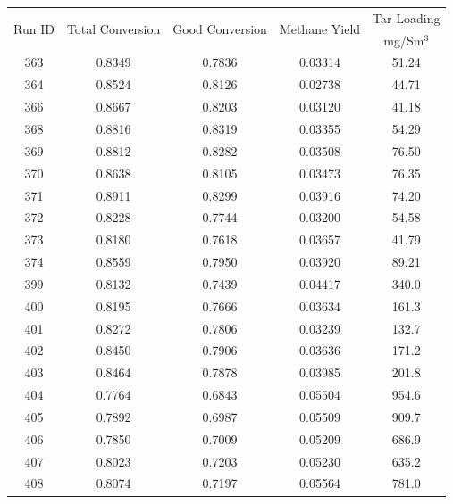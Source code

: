 \documentclass[11pt,twocolumn]{article}
\begin{document}
\begin{center}
\begin{tabular}{ccccc}
\toprule
\multirow{2}{*}{Run ID} &  \multirow{2}{*}{Total Conversion} &  \multirow{2}{*}{Good Conversion} &  \multirow{2}{*}{Methane Yield} & Tar Loading \\
{}	&	{}	&	{}	&	{}	&	mg/Sm$^3$	\\
\midrule
363    &     0.8349 &      0.7836 &        0.03314 &            51.24 \\
364    &     0.8524 &      0.8126 &        0.02738 &            44.71 \\
366    &     0.8667 &      0.8203 &        0.03120 &            41.18 \\
368    &     0.8816 &      0.8319 &        0.03355 &            54.29 \\
369    &     0.8812 &      0.8282 &        0.03508 &            76.50 \\
370    &     0.8638 &      0.8105 &        0.03473 &            76.35 \\
371    &     0.8911 &      0.8299 &        0.03916 &            74.20 \\
372    &     0.8228 &      0.7744 &        0.03200 &            54.58 \\
373    &     0.8180 &      0.7618 &        0.03657 &            41.79 \\
374    &     0.8559 &      0.7950 &        0.03920 &            89.21 \\
399    &     0.8132 &      0.7439 &        0.04417 &            340.0 \\
400    &     0.8195 &      0.7666 &        0.03634 &            161.3 \\
401    &     0.8272 &      0.7806 &        0.03239 &            132.7 \\
402    &     0.8450 &      0.7906 &        0.03636 &            171.2 \\
403    &     0.8464 &      0.7878 &        0.03985 &            201.8 \\
404    &     0.7764 &      0.6843 &        0.05504 &            954.6 \\
405    &     0.7892 &      0.6987 &        0.05509 &            909.7 \\
406    &     0.7850 &      0.7009 &        0.05209 &            686.9 \\
407    &     0.8023 &      0.7203 &        0.05230 &            635.2 \\
408    &     0.8074 &      0.7197 &        0.05564 &            781.0 \\

\end{tabular}
\end{center}
\end{document}
